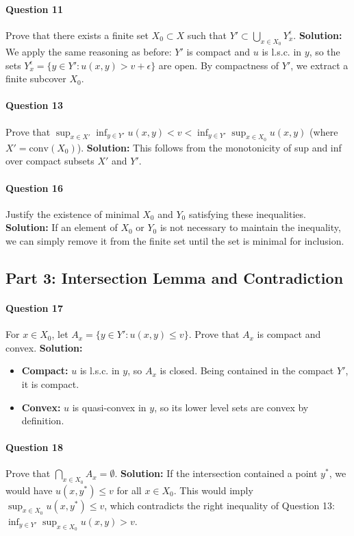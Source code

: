 \paragraph{Question 11} Prove that there exists a finite set $X_0 \subset X$ such that $Y' \subset \bigcup_{x \in X_0} Y_x^\epsilon$.
\textbf{Solution:} We apply the same reasoning as before: $Y'$ is compact and $u$ is l.s.c. in $y$, so the sets $Y_x^\epsilon = \{y \in Y' : u(x,y) > v + \epsilon\}$ are open. By compactness of $Y'$, we extract a finite subcover $X_0$.

\paragraph{Question 13} Prove that $\sup_{x \in X'} \inf_{y \in Y'} u(x,y) < v < \inf_{y \in Y'} \sup_{x \in X_0} u(x,y)$ (where $X' = \text{conv}(X_0)$).
\textbf{Solution:} This follows from the monotonicity of sup and inf over compact subsets $X'$ and $Y'$.

\paragraph{Question 16} Justify the existence of minimal $X_0$ and $Y_0$ satisfying these inequalities.
\textbf{Solution:} If an element of $X_0$ or $Y_0$ is not necessary to maintain the inequality, we can simply remove it from the finite set until the set is minimal for inclusion.

\subsection{Part 3: Intersection Lemma and Contradiction}

\paragraph{Question 17} For $x \in X_0$, let $A_x = \{y \in Y' : u(x,y) \leq v\}$. Prove that $A_x$ is compact and convex.
\textbf{Solution:} 
\begin{itemize}
    \item \textbf{Compact:} $u$ is l.s.c. in $y$, so $A_x$ is closed. Being contained in the compact $Y'$, it is compact.
    \item \textbf{Convex:} $u$ is quasi-convex in $y$, so its lower level sets are convex by definition.
\end{itemize}

\paragraph{Question 18} Prove that $\bigcap_{x \in X_0} A_x = \emptyset$.
\textbf{Solution:} If the intersection contained a point $y^*$, we would have $u(x, y^*) \leq v$ for all $x \in X_0$. This would imply $\sup_{x \in X_0} u(x, y^*) \leq v$, which contradicts the right inequality of Question 13: $\inf_{y \in Y'} \sup_{x \in X_0} u(x, y) > v$.

